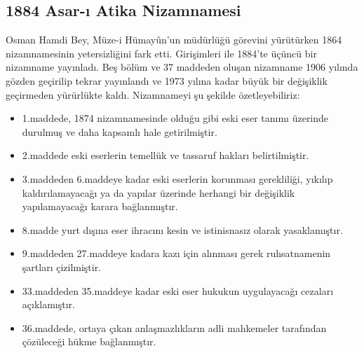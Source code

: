 \subsection{1884 Asar-ı Atika Nizamnamesi}
\indent\indent Osman Hamdi Bey, Müze-i Hümayûn'un müdürlüğü görevini yürütürken 1864 nizamnamesinin yetersizliğini fark etti. Girişimleri ile 1884'te üçüncü bir nizamname yayınladı. Beş bölüm ve 37 maddeden oluşan nizamname 1906 yılında gözden geçirilip tekrar yayınlandı ve 1973 yılına kadar büyük bir değişiklik geçirmeden yürürlükte kaldı.\cite{dilbaz_2} Nizamnameyi şu şekilde özetleyebiliriz:\cite{mumcu_3}
\begin{itemize}
    \item 1.maddede, 1874 nizamnamesinde olduğu gibi eski eser tanımı üzerinde durulmuş ve daha kapsamlı hale getirilmiştir.
    \item 2.maddede eski eserlerin temellük ve tassaruf hakları belirtilmiştir.
    \item 3.maddeden 6.maddeye kadar eski eserlerin korunması gerekliliği, yıkılıp kaldırılamayacağı ya da yapılar üzerinde herhangi bir değişiklik yapılamayacağı karara bağlanmıştır.
    \item 8.madde yurt dışına eser ihracını kesin ve istinisnasız olarak yasaklamıştır.
    \item 9.maddeden 27.maddeye kadara kazı için alınması gerek ruhsatnamenin şartları çizilmiştir.
    \item 33.maddeden 35.maddeye kadar eski eser hukukun uygulayacağı cezaları açıklamıştır.
    \item 36.maddede, ortaya çıkan anlaşmazlıkların adli mahkemeler tarafından çözüleceği hükme bağlanmıştır.
\end{itemize}